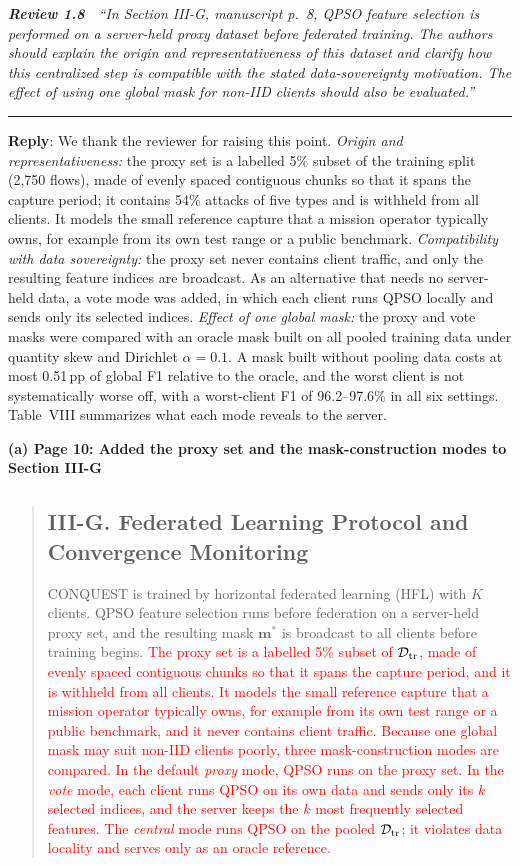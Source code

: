 \documentclass[11pt]{article}
\newenvironment{excerpt}{\begin{quote}\sloppy}{\end{quote}}
\newcommand{\review}[2]{\par\bigskip\noindent\textbf{\textit{Review #1}}\ \ \textit{``#2''}\par\smallskip\hrule\medskip}
\newcommand{\reply}{\noindent\textbf{Reply}: }
\newcommand{\mshead}[2]{\subsection*{\textbf{#1. #2}}}
\newcommand{\loc}[1]{\par\medskip\noindent\textbf{#1}\par}
\begin{document}
\review{1.8}{In Section III-G, manuscript p.~8, QPSO feature selection is performed on a server-held proxy dataset before federated training. The authors should explain the origin and representativeness of this dataset and clarify how this centralized step is compatible with the stated data-sovereignty motivation. The effect of using one global mask for non-IID clients should also be evaluated.}

\reply We thank the reviewer for raising this point. \textit{Origin and
representativeness:} the proxy set is a labelled 5\% subset of the training
split (2{,}750 flows), made of evenly spaced contiguous chunks so that it spans
the capture period; it contains 54\% attacks of five types and is withheld
from all clients. It models the small reference capture that a mission
operator typically owns, for example from its own test range or a public
benchmark. \textit{Compatibility with data sovereignty:} the proxy set never
contains client traffic, and only the resulting feature indices are
broadcast. As an alternative that needs no server-held data, a vote mode was
added, in which each client runs QPSO locally and sends only its selected
indices. \textit{Effect of one global mask:} the proxy and vote masks were
compared with an oracle mask built on all pooled training data under
quantity skew and Dirichlet $\alpha=0.1$. A mask built without pooling data
costs at most 0.51\,pp of global F1 relative to the oracle, and the worst
client is not systematically worse off, with a worst-client F1 of
96.2--97.6\% in all six settings. Table~VIII summarizes what each mode
reveals to the server.

\loc{(a) Page 10: Added the proxy set and the mask-construction modes to Section III-G}
\begin{excerpt}
\mshead{III-G}{Federated Learning Protocol and Convergence Monitoring}


CONQUEST is trained by horizontal federated learning (HFL) with $K$
clients. QPSO feature selection runs before federation on a
server-held proxy set, and the resulting mask $\mathbf{m}^{*}$ is
broadcast to all clients before training begins.
\textcolor{red}{The proxy set is a labelled 5\% subset of
$\mathcal{D}_{\rm tr}$, made of evenly spaced contiguous chunks so
that it spans the capture period, and it is withheld from all
clients. It models the small reference capture that a mission
operator typically owns, for example from its own test range or a
public benchmark, and it never contains client traffic. Because one
global mask may suit non-IID clients poorly, three mask-construction
modes are compared. In the default \textit{proxy} mode, QPSO runs on
the proxy set. In the \textit{vote} mode, each client runs QPSO on its
own data and sends only its $k$ selected indices, and the server
keeps the $k$ most frequently selected features. The
\textit{central} mode runs QPSO on the pooled $\mathcal{D}_{\rm tr}$;
it violates data locality and serves only as an oracle reference.}
\end{excerpt}
\end{document}
